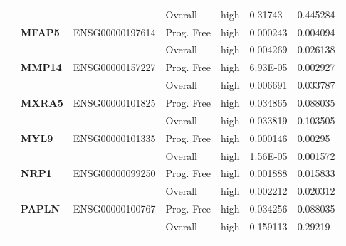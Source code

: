 \begin{spacing}{1}
{\begin{longtable}{|>{\bfseries}p{2cm}|>{\bfseries}p{1.9cm}|p{2.8cm}|p{2cm}|p{2cm}|p{1.5cm}|p{1.5cm}|}
            \hhline{~~~----}
             &          &                 & Overall    & high & 0.31743  & 0.445284                \\
            \hhline{~======}
             & MFAP5    & ENSG00000197614 & Prog. Free & high & 0.000243 & 0.004094                \\
            \hhline{~~~----}
             &          &                 & Overall    & high & 0.004269 & 0.026138                \\
            \hhline{~======}
             & MMP14    & ENSG00000157227 & Prog. Free & high & 6.93E-05 & 0.002927                \\
            \hhline{~~~----}
             &          &                 & Overall    & high & 0.006691 & 0.033787                \\
            \hhline{~======}
             & MXRA5    & ENSG00000101825 & Prog. Free & high & 0.034865 & 0.088035                \\
            \hhline{~~~----}
             &          &                 & Overall    & high & 0.033819 & 0.103505                \\
            \hhline{~======}
             & MYL9     & ENSG00000101335 & Prog. Free & high & 0.000146 & 0.00295                 \\
            \hhline{~~~----}
             &          &                 & Overall    & high & 1.56E-05 & 0.001572                \\
            \hhline{~======}
             & NRP1     & ENSG00000099250 & Prog. Free & high & 0.001888 & 0.015833                \\
            \hhline{~~~----}
             &          &                 & Overall    & high & 0.002212 & 0.020312                \\
            \hhline{~======}
             & PAPLN    & ENSG00000100767 & Prog. Free & high & 0.034256 & 0.088035                \\
            \hhline{~~~----}
             &          &                 & Overall    & high & 0.159113 & 0.29219                 \\
            \hhline{~======}


\end{longtable}}
\end{spacing}
